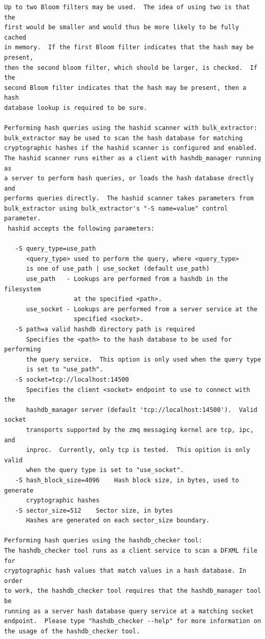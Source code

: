 \documentclass[11pt,twoside]{article}
\begin{document}
\begin{small}
\begin{verbatim}
Up to two Bloom filters may be used.  The idea of using two is that the
first would be smaller and would thus be more likely to be fully cached
in memory.  If the first Bloom filter indicates that the hash may be present,
then the second bloom filter, which should be larger, is checked.  If the
second Bloom filter indicates that the hash may be present, then a hash
database lookup is required to be sure.

Performing hash queries using the hashid scanner with bulk_extractor:
bulk_extractor may be used to scan the hash database for matching
cryptographic hashes if the hashid scanner is configured and enabled.
The hashid scanner runs either as a client with hashdb_manager running as
a server to perform hash queries, or loads the hash database drectly and
performs queries directly.  The hashid scanner takes parameters from
bulk_extractor using bulk_extractor's "-S name=value" control parameter.
 hashid accepts the following parameters:

   -S query_type=use_path
      <query_type> used to perform the query, where <query_type>
      is one of use_path | use_socket (default use_path)
      use_path   - Lookups are performed from a hashdb in the filesystem
                   at the specified <path>.
      use_socket - Lookups are performed from a server service at the
                   specified <socket>.
   -S path=a valid hashdb directory path is required
      Specifies the <path> to the hash database to be used for performing
      the query service.  This option is only used when the query type
      is set to "use_path".
   -S socket=tcp://localhost:14500
      Specifies the client <socket> endpoint to use to connect with the
      hashdb_manager server (default 'tcp://localhost:14500').  Valid socket
      transports supported by the zmq messaging kernel are tcp, ipc, and
      inproc.  Currently, only tcp is tested.  This opition is only valid
      when the query type is set to "use_socket".
   -S hash_block_size=4096    Hash block size, in bytes, used to generate
      cryptographic hashes
   -S sector_size=512    Sector size, in bytes
      Hashes are generated on each sector_size boundary.

Performing hash queries using the hashdb_checker tool:
The hashdb_checker tool runs as a client service to scan a DFXML file for
cryptographic hash values that match values in a hash database. In order
to work, the hashdb_checker tool requires that the hashdb_manager tool be
running as a server hash database query service at a matching socket
endpoint.  Please type "hashdb_checker --help" for more information on
the usage of the hashdb_checker tool.


\end{verbatim}
\end{small}
\end{document}
